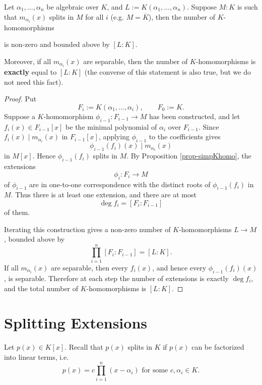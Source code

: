 \begin{theorem} \label{thm-genKhomo}
Let $\alpha_1, \dots, \alpha_n$ be algebraic over $K$, and $L := K(\alpha_1, \dots, \alpha_n)$. Suppose $M:K$ is such that $m_{\alpha_i}(x)$ splits in $M$ for all $i$ (e.g. $M = \overline{K}$), then the number of $K$-homomorphisms

is non-zero and bounded above by $[L:K]$.

Moreover, if all $m_{\alpha_i}(x)$ are separable, then the number of $K$-homomorphisms is {\bf exactly} equal to $[L:K]$ (the converse of this statement is also true, but we do not need this fact).
\end{theorem}
\begin{proof}
Put
\[
F_i:=K(\alpha_1,\dots,\alpha_i),
\qquad F_0:=K.
\]
Suppose a $K$-homomorphism $\phi_{i-1}:F_{i-1}\to M$ has been constructed, and let
$f_i(x)\in F_{i-1}[x]$ be the minimal polynomial of $\alpha_i$ over $F_{i-1}$.
Since $f_i(x)\mid m_{\alpha_i}(x)$ in $F_{i-1}[x]$, applying $\phi_{i-1}$ to the coefficients gives
\[
\phi_{i-1}(f_i)(x)\mid m_{\alpha_i}(x)
\]
in $M[x]$. Hence $\phi_{i-1}(f_i)$ splits in $M$. By Proposition \ref{prop-simpKhomo}, the extensions
\[
\phi_i:F_i\to M
\]
of $\phi_{i-1}$ are in one-to-one correspondence with the distinct roots of $\phi_{i-1}(f_i)$ in $M$. Thus there is at least one extension, and there are at most
\[
\deg f_i=[F_i:F_{i-1}]
\]
of them.

Iterating this construction gives a non-zero number of $K$-homomorphisms $L\to M$, bounded above by
\[
\prod_{i=1}^n [F_i:F_{i-1}]=[L:K].
\]
If all $m_{\alpha_i}(x)$ are separable, then every $f_i(x)$, and hence every $\phi_{i-1}(f_i)(x)$, is separable. Therefore at each step the number of extensions is exactly $\deg f_i$, and the total number of $K$-homomorphisms is $[L:K]$.
\end{proof}


\section{Splitting Extensions} \label{sec-splitting}
Let $p(x) \in K[x]$. Recall that $p(x)$ splits in $K$ if $p(x)$ can be factorized into linear terms, i.e.
\[
p(x) = c \prod_{i=1}^n (x - \alpha_i) \text{ for some } c, \alpha_i \in K.
\]

